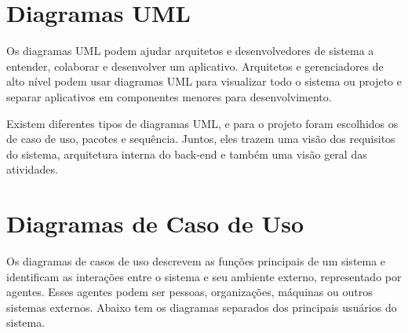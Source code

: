 \section{Diagramas UML}

Os diagramas UML podem ajudar arquitetos e desenvolvedores de sistema a entender, colaborar e desenvolver um aplicativo. Arquitetos e gerenciadores de alto nível podem usar diagramas UML para visualizar todo o sistema ou projeto e separar aplicativos em componentes menores para desenvolvimento.\cite{IBM}

Existem diferentes tipos de diagramas UML, e para o projeto foram escolhidos os de caso de uso, pacotes e sequência. Juntos, eles trazem uma visão dos requisitos do sistema, arquitetura interna do back-end e também uma visão geral das atividades.

\section{Diagramas de Caso de Uso}

Os diagramas de casos de uso descrevem as funções principais de um sistema e identificam as interações entre o sistema e seu ambiente externo, representado por agentes. Esses agentes podem ser pessoas, organizações, máquinas ou outros sistemas externos\cite{IBM}. Abaixo tem os diagramas separados dos principais usuários do sistema.

